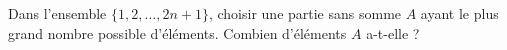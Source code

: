 Dans l'ensemble $\{1, 2, \ldots, 2n + 1\}$, choisir une partie sans somme $A$ ayant le plus grand nombre possible d'éléments. Combien d'éléments $A$ a-t-elle ?

